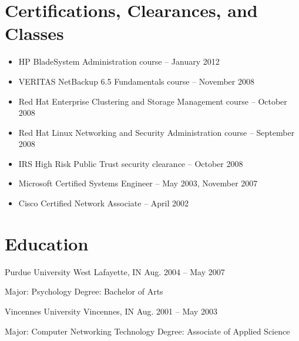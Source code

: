 \documentclass[9pt]{extarticle} %
\begin{document}
\section{Certifications, Clearances, and Classes}

\begin{indented}
	\begin{itemize}
		\item HP BladeSystem Administration course -- January 2012
		\item VERITAS NetBackup 6.5 Fundamentals course -- November 2008
		\item Red Hat Enterprise Clustering and Storage Management course -- October 2008
		\item Red Hat Linux Networking and Security Administration course -- September 2008
		\item IRS High Risk Public Trust security clearance -- October 2008
		\item Microsoft Certified Systems Engineer -- May 2003, November 2007
		\item Cisco Certified Network Associate -- April 2002
	\end{itemize}
\end{indented}


\section{Education}

Purdue University \tab West Lafayette, IN \tab Aug. 2004 -- May 2007\\
\begin{indented}
	Major: Psychology \tabto{8cm} Degree: Bachelor of Arts
\end{indented}

\bigskip


Vincennes University \tab Vincennes, IN \tab Aug. 2001 -- May 2003\\
\begin{indented}
	Major: Computer Networking Technology \tabto{8cm} Degree: Associate of Applied Science
\end{indented}

\end{document}
